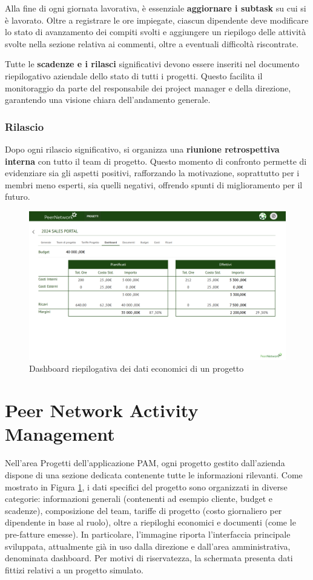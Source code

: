     Alla fine di ogni giornata lavorativa, è essenziale \textbf{aggiornare i subtask} su cui si è lavorato. Oltre a
    registrare le ore impiegate, ciascun dipendente deve modificare lo stato di avanzamento dei compiti svolti e aggiungere
    un riepilogo delle attività svolte nella sezione relativa ai commenti, oltre a eventuali difficoltà riscontrate.
    
    Tutte le \textbf{scadenze e i rilasci} significativi devono essere inseriti nel documento riepilogativo aziendale
    dello stato di tutti i progetti. Questo facilita il monitoraggio da parte del responsabile dei project manager e della direzione,
    garantendo una visione chiara dell’andamento generale.

    \subsubsection{Rilascio}
    Dopo ogni rilascio significativo, si organizza una \textbf{riunione retrospettiva interna} con tutto il team di progetto. Questo momento
    di confronto permette di evidenziare sia gli aspetti positivi, rafforzando la motivazione, soprattutto per i membri meno
    esperti, sia quelli negativi, offrendo spunti di miglioramento per il futuro.

\begin{figure}
    \centering
    \includegraphics[width=\linewidth]{figures/dashboardPAM.png}
    \caption{Dashboard riepilogativa dei dati economici di un progetto}
    \label{fig:pam-dashboard}
\end{figure}
\section{Peer Network Activity Management}
Nell'area Progetti dell’applicazione \ac{PAM}, ogni progetto gestito dall’azienda dispone di una sezione dedicata
contenente tutte le informazioni rilevanti.
Come mostrato in Figura \ref{fig:pam-dashboard}, i dati specifici del progetto sono organizzati in diverse categorie:
informazioni generali (contenenti ad esempio cliente, budget e scadenze), composizione del team, tariffe di progetto
(costo giornaliero per dipendente in base al ruolo), oltre a riepiloghi economici e documenti (come le pre-fatture emesse).
In particolare, l'immagine riporta l'interfaccia principale sviluppata, attualmente già in uso dalla direzione e
dall'area amministrativa, denominata dashboard. Per motivi di riservatezza, la schermata presenta dati fittizi relativi
a un progetto simulato.

